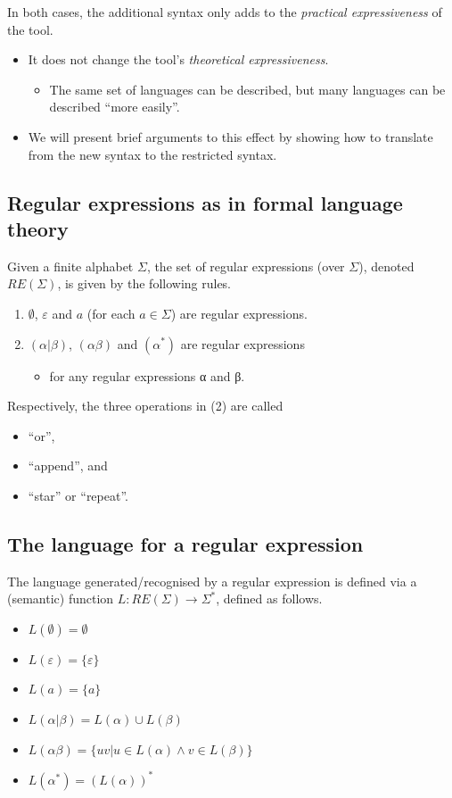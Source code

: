 \documentclass[11pt]{article}
\theoremstyle{definition}
\begin{document}
In both cases, the additional syntax only adds to
the \emph{practical expressiveness} of the tool.
\begin{itemize}
\item It does not change the tool's \emph{theoretical expressiveness}.
\begin{itemize}
\item The same set of languages can be described,
but many languages can be described “more easily”.
\end{itemize}
\item We will present brief arguments to this effect
by showing how to translate from the new syntax
to the restricted syntax.
\end{itemize}

\subsection{Regular expressions as in formal language theory}
\label{sec:orgef114ec}
Given a finite alphabet \(Σ\),
the set of regular expressions (over \(Σ\)),
denoted \(RE(Σ)\), is given
by the following rules.
\begin{enumerate}
\item \(∅\), \(ε\) and \(a\) (for each \(a ∈ Σ\)) are regular expressions.
\item \((α | β)\), \((αβ)\) and \((α^{*})\) are regular expressions
\begin{itemize}
\item for any regular expressions α and β.
\end{itemize}
\end{enumerate}

Respectively, the three operations in (2) are called
\begin{itemize}
\item “or”,
\item “append”, and
\item “star” or “repeat”.
\end{itemize}

\subsection{The language for a regular expression}
\label{sec:orgf0651a3}
The language generated/recognised by a regular expression
is defined via a (semantic) function \(L : RE(Σ) → Σ^{*}\),
defined as follows.
\begin{itemize}
\item \(L(∅) = ∅\)
\item \(L(ε) = \{ ε \}\)
\item \(L(a) = \{ a \}\)
\item \(L(α | β) = L(α) ∪ L(β)\)
\item \(L(αβ) = \{ uv | u ∈ L(α) ∧ v ∈ L(β) \}\)
\item \(L(α^*) = (L(α))^*\)
\end{itemize}
\end{document}
